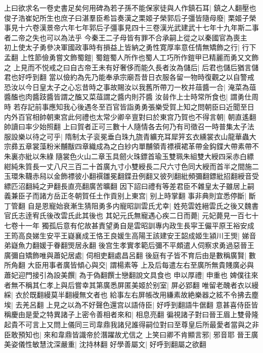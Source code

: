 上曰欲求名一卷史書足矣何用碑為若子孫不能保家徒與人作鎮石耳|{
	鎮之人翻壓也}
俊子浩崔妃所生也庶子曰湛羣臣希旨奏漢之栗姬子榮郭后子彊皆隨母廢|{
	栗姬子榮事見十六卷漢景帝六年七年郭后子彊事見四十三卷漢光武建武十七年十九年斯二事者二帝之失也可以為法乎}
今秦王二子母皆有罪不合承嗣上從之以秦國官為喪主　初上使太子勇參决軍國政事時有損益上皆納之勇性寛厚率意任情無矯飾之行|{
	行下孟翻}
上性節儉勇嘗文飾蜀鎧|{
	蜀鎧蜀人所作也蜀人工巧所作鎧甲已精麗而勇又文飾之}
上見而不悦戒之曰自古帝王未有好奢侈而能久長者汝為儲后|{
	后君也儲后猶言儲君也好呼到翻}
當以儉約為先乃能奉承宗廟吾昔日衣服各留一物時復觀之以自警戒恐汝以今日皇太子之心忘昔時之事故賜汝以我舊所帶刀一枚并葅醬一合|{
	淹菜為葅醬醢也肉醬跂醬皆謂之醢又菜葅謂之醬内則芥醬}
汝㫺作上士時常所食也|{
	謂勇仕周時}
若存記前事應知我心後遇冬至百官皆詣勇勇張樂受賀上知之問朝臣曰近聞至日内外百官相帥朝東宫此何禮也太常少卿辛亶對曰於東宫乃賀也不得言朝|{
	朝直遙翻帥讀曰率少始照翻}
上曰賀者正可三數十人隨情各去何乃有司徵召一時普集太子法服設樂以待之可乎|{
	隋制太子衮冕垂白珠九旒青纊充耳犀笄玄衣纁裳衣山龍華蟲大宗彞五章裳藻粉米黼黻四章織成為之白紗内單黼領青褾襈裙革帶金鈎鍱大帶素帶不朱裏亦紕以朱綠隨裳色火山二章玉具劒火珠鏢首瑜玉雙珮朱組雙大綬四采赤白縹紺純朱質長一丈八尺三百二十首廣九寸小雙綬長二尺六寸色同大綬而首半之間施二玉環朱韈赤舄以金飾褾彼小翻襈雛冕翻鍱丑例翻又彼列翻紕頻彌翻鏢紕招翻綬音受縹匹沼翻純之尹翻長直亮翻廣苦曠翻}
因下詔曰禮有等差君臣不雜皇太子雖居上嗣義兼臣子而諸方岳正冬朝賀任土作貢别上東宫|{
	别上時掌翻}
事非典則宜悉停斷|{
	斷丁管翻}
自是恩寵始衰漸生猜阻勇多内寵昭訓雲氏尤幸|{
	姓苑雲姓縉雲氏之後又魏書官氏志逹宥氏後改雲氏此其後也}
其妃元氏無寵遇心疾二日而薨|{
	元妃薨見一百七十七卷十一年}
獨孤后意有佗故甚責望勇自是雲昭訓專内政生長寜王儼平原王裕安成王筠高良娣生安平王嶷襄成王恪王良媛生高陽王該建安王韶成姬生潁川王煚|{
	娣音弟嶷魚力翻媛于眷翻煚居永翻}
後宫生孝實孝範后彌不平頗遣人伺察求勇過惡晉王廣彌自矯飾唯與蕭妃居處|{
	伺相吏翻處昌呂翻}
後庭有子皆不育后由是數稱廣賢|{
	數所角翻}
大臣用事者廣皆傾心與交|{
	謂楊素等}
上及后每遣左右至廣所無貴賤廣必與蕭妃迎門接引為設美饌|{
	為于偽翻饌士戀翻說文具食也}
申以厚禮|{
	申重也}
婢僕往來者無不稱其仁孝上與后嘗幸其第廣悉屏匿美姬於别室|{
	屏必郢翻}
唯留老醜者衣以縵綵|{
	衣於既翻縵莫半翻縵無文者也}
給事左右屏帳改用縑素故絶樂器之絃不令拂去塵埃|{
	去羌呂翻}
上見之以為不好聲色還宫以語侍臣|{
	好呼到翻語牛倨翻}
意甚喜侍臣皆稱慶由是愛之特異諸子上密令善相者來和|{
	相息亮翻}
徧視諸子對曰晉王眉上雙骨隆起貴不可言上又問上儀同三司韋鼎我諸兒誰得嗣位對曰至尊皇后所最愛者當與之非臣敢預知也|{
	來和韋鼎皆識帝於潛躍故尤信之}
上笑曰卿不肯顯言邪|{
	邪音耶}
晉王廣美姿儀性敏慧沈深嚴重|{
	沈持林翻}
好學善屬文|{
	好呼到翻屬之欲翻}
